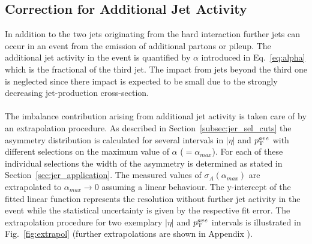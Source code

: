 \subsection{Correction for Additional Jet Activity}
\label{subsec:jer_corrections_alpha}
In addition to the two jets originating from the hard interaction further jets can occur in an event from the emission of additional partons or pileup. The additional jet activity in the event is quantified by $\alpha$ introduced in Eq.~\ref{eq:alpha} which is the fractional \pt of the third jet. The impact from jets beyond the third one is neglected since there impact is expected to be small due to the strongly decreasing jet-production cross-section. \\
\\
The imbalance contribution arising from additional jet activity is taken care of by an extrapolation procedure. As described in Section~\ref{subsec:jer_sel_cuts} the asymmetry distribution is calculated for several intervals in $|\eta|$ and $p_{\text{T}}^{ave}$ with different selections on the maximum value of $\alpha$ ($=\alpha_{max}$). For each of these individual selections the width of the asymmetry is determined as stated in Section~\ref{sec:jer_application}. The measured values of $\sigma_{A}(\alpha_{max})$ are extrapolated to $\alpha_{max} \rightarrow 0$ assuming a linear behaviour. The y-intercept of the fitted linear function represents the resolution without further jet activity in the event while the statistical uncertainty is given by the respective fit error. The extrapolation procedure for two exemplary $|\eta|$ and $p_{\text{T}}^{ave}$ intervals is illustrated in Fig.~\ref{fig:extrapol} (further extrapolations are shown in Appendix ). \\
\\
